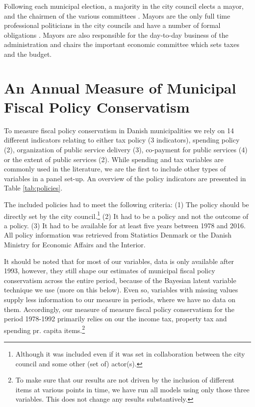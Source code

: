 \documentclass[a4paper,12pt]{article}
\begin{document}
Following each municipal election, a majority in the city council elects a mayor, and the chairmen of the various committees \citep{serritzlew2008explaining}. Mayors are the only full time professional politicians in the city councils and have a number of formal obligations \citep{kjaer2015urban}. Mayors are also responsible for the day-to-day business of the administration and chairs the important economic committee which sets taxes and the budget.

\section{An Annual Measure of Municipal Fiscal Policy Conservatism}
To measure fiscal policy conservatism in Danish municipalities we rely on 14 different indicators relating to either tax policy (3 indicators), spending policy (2), organization of public service delivery (3), co-payment for public services (4) or the extent of public services (2). While  spending and tax variables are commonly used in the literature, we are the first to include other types of variables in a panel set-up. An overview of the policy indicators are presented in Table \ref{tab:policies}.

The included policies had to meet the following criteria: (1) The policy should be directly set by the city council.\footnote{Although it was included even if it was set in collaboration between the city council and some other  (set of) actor(s).} (2) It had to be a policy and not the outcome of a policy. (3) It had to be available for at least five years between 1978 and 2016. All policy information was retrieved from Statistics Denmark or the Danish Ministry for Economic Affairs and the Interior.



It should be noted that for most of our variables, data is only available after 1993, however, they still shape our estimates of municipal fiscal policy conservatism across the entire period, because of the Bayesian latent variable technique we use (more on this below). Even so, variables with missing values supply less information to our measure in periods, where we have no data on them. Accordingly, our measure of measure fiscal policy conservatism for the period 1978-1992 primarily relies on our the income tax, property tax and spending pr. capita items.\footnote{To make sure that our results are not driven by the inclusion of different items at various points in time, we have run all models using only those three variables. This does not change any results substantively.}
\end{document}
